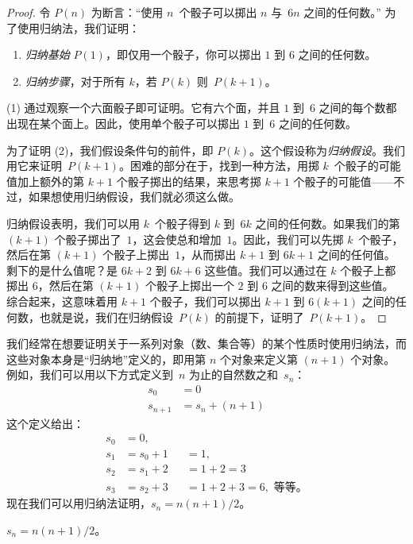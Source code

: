 \documentclass[../../../include/open-logic-section]{subfiles}
\begin{document}
\begin{proof}
令 $P(n)$ 为断言：“使用 $n$~个骰子可以掷出 $n$ 与~$6n$ 之间的任何数。”
为了使用归纳法，我们证明：
\begin{enumerate}
\item \emph{归纳基始} $P(1)$，即仅用一个骰子，你可以掷出 $1$ 到 $6$ 之间的任何数。
\item \emph{归纳步骤}，对于所有 $k$，若 $P(k)$ 则~$P(k+1)$。
\end{enumerate}

(1) 通过观察一个六面骰子即可证明。它有六个面，并且 $1$ 到~$6$ 之间的每个数都出现在某个面上。因此，使用单个骰子可以掷出 $1$ 到~$6$ 之间的任何数。

为了证明 (2)，我们假设条件句的前件，即 $P(k)$。这个假设称为\emph{归纳假设}。我们用它来证明~$P(k+1)$。困难的部分在于，找到一种方法，用掷 $k$~个骰子的可能值加上额外的第 $k+1$ 个骰子掷出的结果，来思考掷 $k+1$ 个骰子的可能值——不过，如果想使用归纳假设，我们就必须这么做。

归纳假设表明，我们可以用 $k$~个骰子得到 $k$ 到~$6k$ 之间的任何数。如果我们的第 $(k+1)$ 个骰子掷出了~$1$，这会使总和增加~$1$。因此，我们可以先掷 $k$~个骰子，然后在第 $(k+1)$ 个骰子上掷出~$1$，从而掷出 $k+1$ 到 $6k+1$ 之间的任何值。
剩下的是什么值呢？是 $6k+2$ 到 $6k+6$ 这些值。我们可以通过在 $k$ 个骰子上都掷出 $6$，然后在第 $(k+1)$ 个骰子上掷出一个 $2$ 到 $6$ 之间的数来得到这些值。
综合起来，这意味着用 $k+1$ 个骰子，我们可以掷出 $k+1$ 到 $6(k+1)$ 之间的任何数，也就是说，我们在归纳假设~$P(k)$ 的前提下，证明了~$P(k+1)$。
\end{proof}

我们经常在想要证明关于一系列对象（数、集合等）的某个性质时使用归纳法，而这些对象本身是“归纳地”定义的，即用第 $n$ 个对象来定义第 $(n+1)$ 个对象。
例如，我们可以用以下方式定义到~$n$ 为止的自然数之和~$s_n$：
\begin{align*}
  s_0 & = 0\\
  s_{n+1} & = s_n + (n+1)
\end{align*}
这个定义给出：
\begin{align*}
  s_0 & = 0,\\
  s_1 & = s_0 + 1 && = 1,\\
  s_2 & = s_1 + 2 && = 1 + 2 = 3\\
  s_3 & = s_2 + 3 && = 1 + 2 + 3 = 6, \text{ 等等。}
\end{align*}
现在我们可以用归纳法证明，$s_n = n(n+1)/2$。

\begin{prop}
  $s_n = n(n+1)/2$。
\end{prop}
\end{document}
